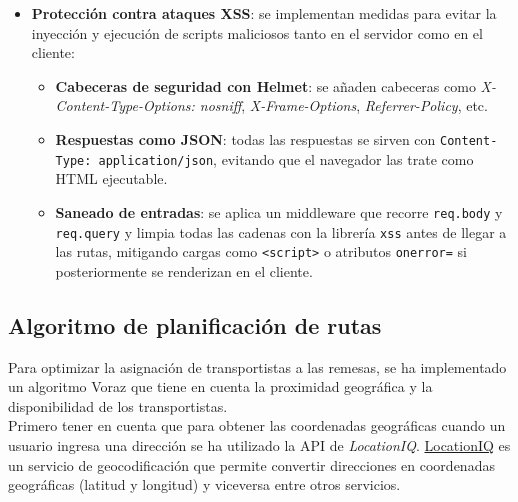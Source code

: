 \begin{itemize}
    Se utiliza la librería \textit{bcrypt} para hashear las contraseñas antes de almacenarlas en la base de datos.
    Es decir, se aplica una función hash que convierte la contraseña en una cadena de caracteres irreconocible.
    De esta forma, aunque un atacante consiga acceder a la base de datos, no podrá obtener las contraseñas originales.
    \item \textbf{Protección contra ataques XSS}: se implementan medidas para evitar la inyección y ejecución de scripts maliciosos tanto en el servidor como en el cliente:
        \begin{itemize}
        \item \textbf{Cabeceras de seguridad con Helmet}: se añaden cabeceras como 
        \textit{X-Content-Type-Options: nosniff}, 
        \textit{X-Frame-Options}, \textit{Referrer-Policy}, etc.
        \item \textbf{Respuestas como JSON}: todas las respuestas se sirven con \texttt{Content-Type: application/json}, evitando que el navegador las trate como HTML ejecutable.
        \item \textbf{Saneado de entradas}: se aplica un middleware que recorre \texttt{req.body} y \texttt{req.query} y limpia todas las cadenas con la librería \texttt{xss} antes de llegar a las rutas, mitigando cargas como \texttt{<script>} o atributos \texttt{onerror=} si posteriormente se renderizan en el cliente.
        \end{itemize}
\end{itemize}

\subsection{Algoritmo de planificación de rutas}
Para optimizar la asignación de transportistas a las remesas, se ha implementado un algoritmo Voraz que tiene en cuenta
la proximidad geográfica y la disponibilidad de los transportistas.\\

Primero tener en cuenta que para obtener las coordenadas geográficas cuando un usuario ingresa una dirección se ha utilizado la API de
\textit{LocationIQ}. \href{https://es.locationiq.com}{LocationIQ} es un servicio de geocodificación que permite convertir
direcciones en coordenadas geográficas (latitud y longitud) y viceversa entre otros servicios.\\

